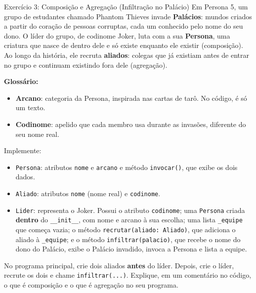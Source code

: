 \begin{exercicio}{Exercício 3: Composição e Agregação (Infiltração no Palácio)}
Em Persona 5, um grupo de estudantes chamado Phantom Thieves invade \textbf{Palácios}: mundos
criados a partir do coração de pessoas corruptas, cada um conhecido pelo nome do seu dono. O
líder do grupo, de codinome Joker, luta com a sua \textbf{Persona}, uma criatura que nasce de
dentro dele e só existe enquanto ele existir (composição). Ao longo da história, ele recruta
\textbf{aliados}: colegas que já existiam antes de entrar no grupo e continuam existindo fora
dele (agregação).

\textbf{Glossário:}
\begin{itemize}
    \item \textbf{Arcano}: categoria da Persona, inspirada nas cartas de tarô. No código, é só
    um texto.
    \item \textbf{Codinome}: apelido que cada membro usa durante as invasões, diferente do seu
    nome real.
\end{itemize}

Implemente:

\begin{itemize}
    \item \texttt{Persona}: atributos \texttt{nome} e \texttt{arcano} e método
    \texttt{invocar()}, que exibe os dois dados.

    \item \texttt{Aliado}: atributos \texttt{nome} (nome real) e \texttt{codinome}.

    \item \texttt{Lider}: representa o Joker. Possui o atributo \texttt{codinome}; uma
    \texttt{Persona} criada \textbf{dentro} do \texttt{\_\_init\_\_}, com nome e arcano à sua
    escolha; uma lista \texttt{\_equipe} que começa vazia; o método
    \texttt{recrutar(aliado: Aliado)}, que adiciona o aliado à \texttt{\_equipe}; e o método
    \texttt{infiltrar(palacio)}, que recebe o nome do dono do Palácio, exibe o Palácio
    invadido, invoca a Persona e lista a equipe.
\end{itemize}

No programa principal, crie dois aliados \textbf{antes} do líder. Depois, crie o líder,
recrute os dois e chame \texttt{infiltrar(...)}. Explique, em um comentário no código, o que é
composição e o que é agregação no seu programa.
\end{exercicio}

